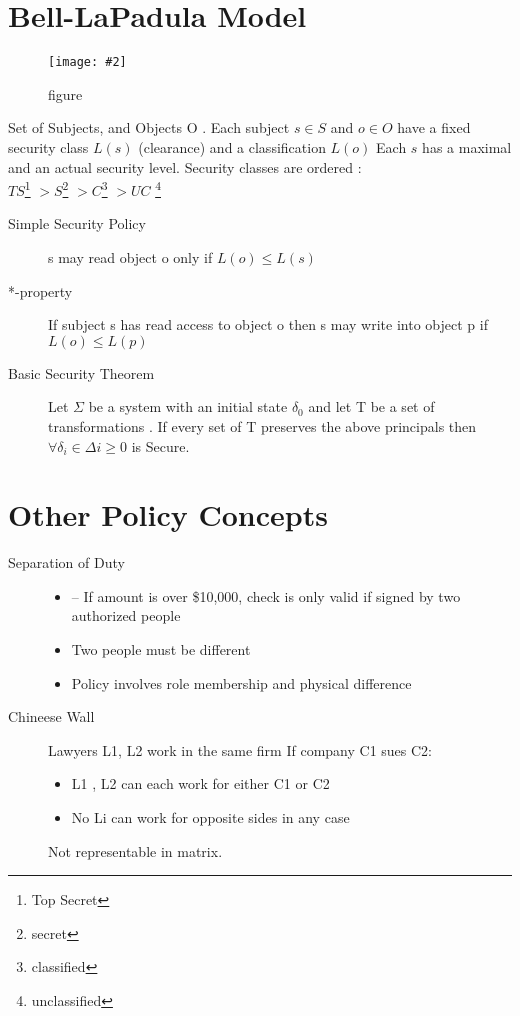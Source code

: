 \documentclass[a4paper,10pt]{scrreprt}
\newcommand{\pic}[2][figure]{\begin{figure}[h]
 \centering
 \texttt{[image: \#2]}
 \caption{#1}
\end{figure}
}
\begin{document}
\section{Bell-LaPadula Model}
\pic{blp.png}

Set of Subjects, and Objects O . Each subject $s \in S$ and $o \in O $ have a fixed security class $L(s)$ (clearance) 
and a classification $L(o)$ Each $s$ has a maximal and an actual security level. Security classes are ordered : \\
$TS$\footnote{Top Secret} $> S$\footnote{secret} $ > C$\footnote{classified} $ > UC$ \footnote{unclassified}

\begin{framed}
 \begin{description}
  \item [Simple Security Policy] s may read object o only if $L(o) \le L(s) $
  \item [*-property] If subject s has read access to object o then s may write into object p if $ L(o) \le L(p)$
  \item [Basic Security Theorem] Let $\Sigma$ be a system with an initial state $\delta_0$ and let T be a set of 
transformations . If every set of T preserves the above  principals then $\forall \delta_i \in \Delta i \ge 0$ is 
Secure.
 \end{description}
\end{framed}
\section{Other Policy Concepts}
\begin{description}
 \item [Separation of Duty] \begin{itemize}
                             \item – If amount is over \$10,000, check is only valid if signed by two
authorized people
\item Two people must be different
\item  Policy involves role membership and physical difference
                            \end{itemize}
\item[Chineese Wall] Lawyers L1, L2 work in the same firm
If company C1 sues C2:
\begin{itemize}
\item L1 , L2 can each work for either C1 or C2
\item  No Li can work for opposite sides in any case
\end{itemize}
Not representable in matrix.
\end{description}
\end{document}
